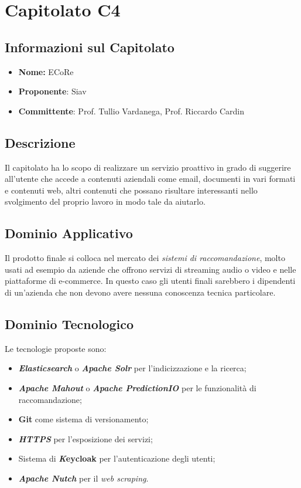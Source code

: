 
\section{Capitolato C4}
\subsection{Informazioni sul Capitolato}
\begin{itemize}
	\item \textbf{Nome:} ECoRe
	\item \textbf{Proponente}: Siav
	\item \textbf{Committente}: Prof. Tullio Vardanega, Prof. Riccardo Cardin
\end{itemize}

\subsection{Descrizione}
Il capitolato ha lo scopo di realizzare un servizio proattivo in grado di suggerire all'utente che accede a contenuti aziendali come email, documenti in vari formati e contenuti web, altri contenuti che possano risultare interessanti nello svolgimento del proprio lavoro in modo tale da aiutarlo. 

\subsection{Dominio Applicativo}
Il prodotto finale si colloca nel mercato dei \textit{sistemi di raccomandazione}, molto usati ad esempio da aziende che offrono servizi di streaming audio o video e nelle piattaforme di e-commerce. In questo caso gli utenti finali sarebbero i dipendenti di un'azienda che non devono avere nessuna conoscenza tecnica particolare. 

\subsection{Dominio Tecnologico}
Le tecnologie proposte sono:
\begin{itemize}
	\item \textit{\textbf{Elasticsearch}} o \textbf{\textit{Apache Solr}} per l'indicizzazione e la ricerca;
	\item \textbf{\textit{Apache Mahout}} o \textbf{\textit{Apache PredictionIO}} per le funzionalità di raccomandazione;
	\item \textbf{Git} come sistema di versionamento;
	\item \textbf{\textit{HTTPS}} per l'esposizione dei servizi;
	\item Sistema di \textbf{\textit Keycloak} per l'autenticazione degli utenti;
	\item \textbf{\textit{Apache Nutch}} per il \textit{web scraping}.
\end{itemize}

